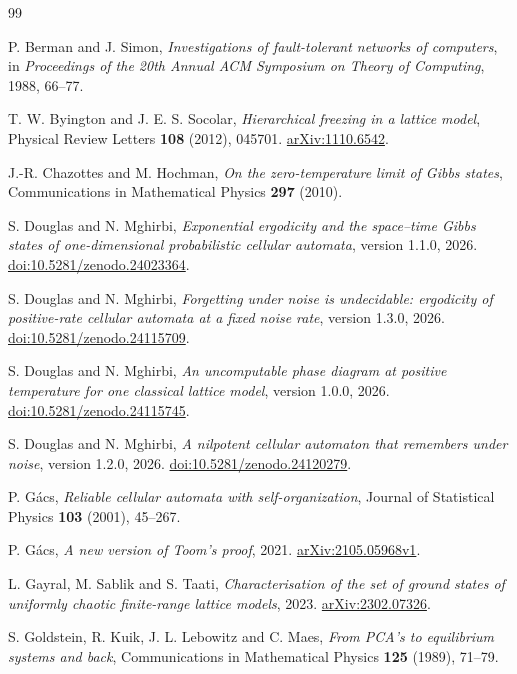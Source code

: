 \documentclass[11pt]{article}
\theoremstyle{plain}
\theoremstyle{definition}
\theoremstyle{remark}
\begin{document}
\begin{thebibliography}{99}\raggedright
{}
P. Berman and J. Simon, \emph{Investigations of fault-tolerant networks of computers},
in \emph{Proceedings of the 20th Annual ACM Symposium on Theory of Computing}, 1988, 66--77.

T. W. Byington and J. E. S. Socolar, \emph{Hierarchical freezing in a lattice model},
Physical Review Letters \textbf{108} (2012), 045701.
\href{https://arxiv.org/abs/1110.6542}{arXiv:1110.6542}.

J.-R. Chazottes and M. Hochman, \emph{On the zero-temperature limit of Gibbs states},
Communications in Mathematical Physics \textbf{297} (2010).

S. Douglas and N. Mghirbi, \emph{Exponential ergodicity and the space--time Gibbs states of one-dimensional probabilistic cellular automata}, version 1.1.0, 2026.
\href{https://doi.org/10.5281/zenodo.24023364}{doi:10.5281/zenodo.24023364}.

S. Douglas and N. Mghirbi, \emph{Forgetting under noise is undecidable: ergodicity of positive-rate cellular automata at a fixed noise rate}, version 1.3.0, 2026.
\href{https://doi.org/10.5281/zenodo.24115709}{doi:10.5281/zenodo.24115709}.

S. Douglas and N. Mghirbi, \emph{An uncomputable phase diagram at positive temperature for one classical lattice model}, version 1.0.0, 2026.
\href{https://doi.org/10.5281/zenodo.24115745}{doi:10.5281/zenodo.24115745}.

S. Douglas and N. Mghirbi, \emph{A nilpotent cellular automaton that remembers under noise}, version 1.2.0, 2026.
\href{https://doi.org/10.5281/zenodo.24120279}{doi:10.5281/zenodo.24120279}.

P. G\'acs, \emph{Reliable cellular automata with self-organization},
Journal of Statistical Physics \textbf{103} (2001), 45--267.

P. G\'acs, \emph{A new version of Toom's proof}, 2021.
\href{https://arxiv.org/abs/2105.05968v1}{arXiv:2105.05968v1}.

L. Gayral, M. Sablik and S. Taati, \emph{Characterisation of the set of ground states of uniformly chaotic finite-range lattice models}, 2023.
\href{https://arxiv.org/abs/2302.07326}{arXiv:2302.07326}.

S. Goldstein, R. Kuik, J. L. Lebowitz and C. Maes, \emph{From PCA's to equilibrium systems and back},
Communications in Mathematical Physics \textbf{125} (1989), 71--79.


\end{thebibliography}
\end{document}
